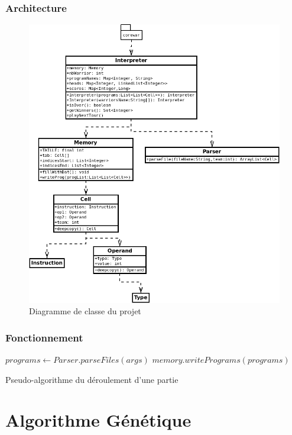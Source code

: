 \documentclass{beamer}
\begin{document}
\begin{frame}
\frametitle{Architecture}
\begin{figure}
	\includegraphics[height=0.7\textheight]{images/diagram-corewar.png}
	\caption{Diagramme de classe du projet}
\end{figure}
\end{frame}

\begin{frame}
\frametitle{Fonctionnement}
	\begin{algorithm}[H]
\DontPrintSemicolon
{}
$programs \gets Parser.parseFiles(args)$\;
$memory.writePrograms(programs)$\;
\caption{Pseudo-algorithme du déroulement d'une partie}
\end{algorithm}
\end{frame}

\section{Algorithme Génétique}
\end{document}

